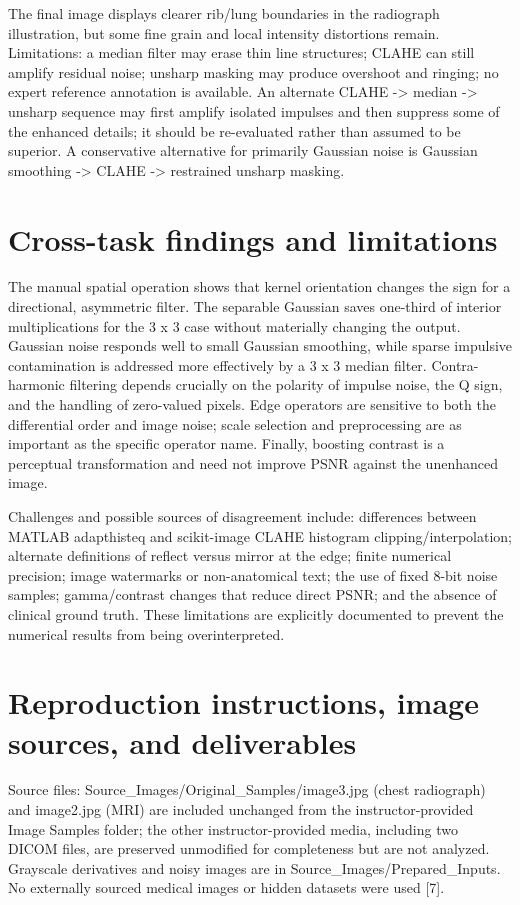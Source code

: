 \documentclass[10pt,a4paper]{article}
\begin{document}
The final image displays clearer rib/lung boundaries in the radiograph illustration, but some fine grain and local intensity distortions remain. Limitations: a median filter may erase thin line structures; CLAHE can still amplify residual noise; unsharp masking may produce overshoot and ringing; no expert reference annotation is available. An alternate CLAHE -> median -> unsharp sequence may first amplify isolated impulses and then suppress some of the enhanced details; it should be re-evaluated rather than assumed to be superior. A conservative alternative for primarily Gaussian noise is Gaussian smoothing -> CLAHE -> restrained unsharp masking.

\section{Cross-task findings and limitations}
The manual spatial operation shows that kernel orientation changes the sign for a directional, asymmetric filter. The separable Gaussian saves one-third of interior multiplications for the 3 x 3 case without materially changing the output. Gaussian noise responds well to small Gaussian smoothing, while sparse impulsive contamination is addressed more effectively by a 3 x 3 median filter. Contra-harmonic filtering depends crucially on the polarity of impulse noise, the Q sign, and the handling of zero-valued pixels. Edge operators are sensitive to both the differential order and image noise; scale selection and preprocessing are as important as the specific operator name. Finally, boosting contrast is a perceptual transformation and need not improve PSNR against the unenhanced image.

Challenges and possible sources of disagreement include: differences between MATLAB adapthisteq and scikit-image CLAHE histogram clipping/interpolation; alternate definitions of reflect versus mirror at the edge; finite numerical precision; image watermarks or non-anatomical text; the use of fixed 8-bit noise samples; gamma/contrast changes that reduce direct PSNR; and the absence of clinical ground truth. These limitations are explicitly documented to prevent the numerical results from being overinterpreted.

\section{Reproduction instructions, image sources, and deliverables}
Source files: Source\_Images/Original\_Samples/image3.jpg (chest radiograph) and image2.jpg (MRI) are included unchanged from the instructor-provided Image Samples folder; the other instructor-provided media, including two DICOM files, are preserved unmodified for completeness but are not analyzed. Grayscale derivatives and noisy images are in Source\_Images/Prepared\_Inputs. No externally sourced medical images or hidden datasets were used [7].
\end{document}
